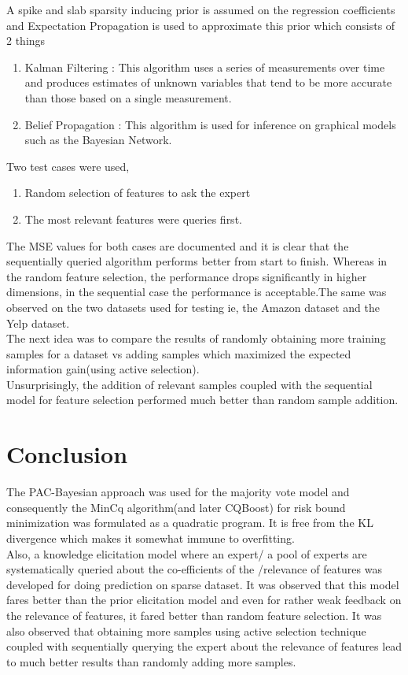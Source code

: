 \documentclass[11pt]{article}
\begin{document}
A spike and slab sparsity inducing prior is assumed on the regression coefficients and Expectation Propagation is used to approximate this prior which consists of 2 things 
\begin{enumerate}
\item Kalman Filtering : This algorithm uses a series of measurements over time and produces estimates of unknown variables that tend to be more accurate than those based on a single measurement.
\item  Belief Propagation : This algorithm is used for inference on graphical models such as the Bayesian Network.
\end{enumerate}
Two test cases were used, 
\begin{enumerate}
\item Random selection of features to ask the expert
\item The most relevant features were queries first. 
\end{enumerate}
The MSE values for both cases are documented and it is clear that the sequentially queried algorithm performs better from start to finish. Whereas in the random feature selection, the performance drops significantly in higher dimensions, in the sequential case the performance is acceptable.The same was observed on the two datasets used for testing ie, the Amazon dataset and the Yelp dataset.\\
The next idea was to compare the results of randomly obtaining more training samples for a dataset vs adding samples which maximized the expected information gain(using active selection). \\ 
Unsurprisingly, the addition of relevant samples coupled with the sequential model for feature selection performed much better than random sample addition.

\section{Conclusion}
The PAC-Bayesian approach was used for the majority vote model and consequently the MinCq algorithm(and later CQBoost) for risk bound minimization was formulated as a quadratic program. It is free from the KL divergence which makes it somewhat immune to overfitting.\\ Also, a knowledge elicitation model where an expert/ a pool of experts are systematically queried about the co-efficients of the /relevance of features was developed for doing prediction on sparse dataset. It was observed that this model fares better than the prior elicitation model and even for rather weak feedback on the relevance of features, it fared better than random feature selection. It was also observed that obtaining more samples using active selection technique coupled with sequentially querying the expert about the relevance of features lead to much better results than randomly adding more samples.
\end{document}
